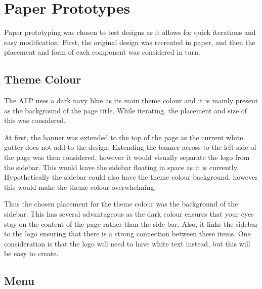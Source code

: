 \documentclass[bsc,frontabs,oneside,singlespacing,parskip,deptreport,logo]{infthesis}
\begin{document}
\section{Paper Prototypes} \label{paperPrototypes}

Paper prototyping was chosen to test designs as it allows for quick iterations and easy modification. First, the original design was recreated in paper, and then the placement and form of each component was considered in turn.

\subsection{Theme Colour}

The AFP uses a dark navy blue as its main theme colour and it is mainly present as the background of the page title. While iterating, the placement and size of this was considered.

At first, the banner was extended to the top of the page as the current white gutter does not add to the design. Extending the banner across to the left side of the page was then considered, however it would visually separate the logo from the sidebar. This would leave the sidebar floating in space as it is currently. Hypothetically the sidebar could also have the theme colour background, however this would make the theme colour overwhelming.

Thus the chosen placement for the theme colour was the background of the sidebar. This has several advantageous as the dark colour ensures that your eyes stay on the content of the page rather than the side bar. Also, it links the sidebar to the logo ensuring that there is a strong connection between these items. One consideration is that the logo will need to have white text instead, but this will be easy to create.


\subsection{Menu}
\end{document}
